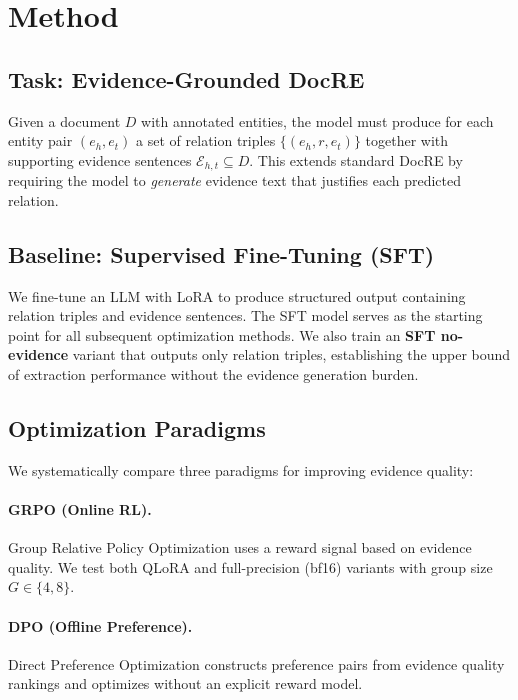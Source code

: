 \documentclass[11pt,a4paper]{article}
\begin{document}
\section{Method}

\subsection{Task: Evidence-Grounded DocRE}

Given a document $D$ with annotated entities, the model must produce for each entity pair $(e_h, e_t)$ a set of relation triples $\{(e_h, r, e_t)\}$ together with supporting evidence sentences $\mathcal{E}_{h,t} \subseteq D$.
This extends standard DocRE by requiring the model to \emph{generate} evidence text that justifies each predicted relation.

\subsection{Baseline: Supervised Fine-Tuning (SFT)}

We fine-tune an LLM with LoRA to produce structured output containing relation triples and evidence sentences.
The SFT model serves as the starting point for all subsequent optimization methods.
We also train an \textbf{SFT no-evidence} variant that outputs only relation triples, establishing the upper bound of extraction performance without the evidence generation burden.

\subsection{Optimization Paradigms}

We systematically compare three paradigms for improving evidence quality:

\paragraph{GRPO (Online RL).}
Group Relative Policy Optimization uses a reward signal based on evidence quality.
We test both QLoRA and full-precision (bf16) variants with group size $G \in \{4, 8\}$.

\paragraph{DPO (Offline Preference).}
Direct Preference Optimization constructs preference pairs from evidence quality rankings and optimizes without an explicit reward model.
\end{document}
